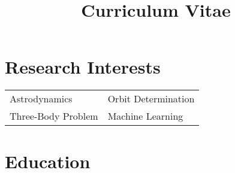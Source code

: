 \documentclass[11pt,a4paper, sans]{moderncv}
\title{Curriculum Vitae}
\begin{document}
\makecvtitle
\vspace{-35 pt}



\section{Research Interests}
\begin{tabular}{ll}
Astrodynamics  \hspace{12em} & Orbit Determination  \\
Three-Body Problem \hspace{12em} & Machine Learning  \\
\end{tabular}



\section{Education}
\end{document}
